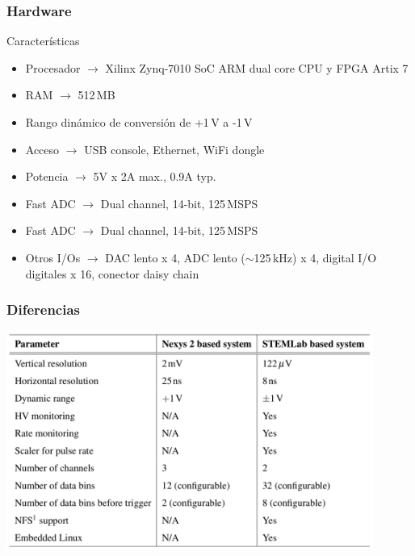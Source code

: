 \documentclass{beamer}
\begin{document}

\begin{frame}
	\frametitle{Hardware}
		\begin{exampleblock}{Características}
			\begin{itemize}
							\item Procesador $\to$ \alert{Xilinx Zynq-7010 SoC ARM dual core
											CPU y FPGA Artix 7}
				\item RAM $\to$ 512\,MB
				\item Rango dinámico de conversión de +1\,V a -1\,V
				\item Acceso $\to$ USB console, Ethernet, WiFi dongle
				\item Potencia $\to$ 5V x 2A max., 0.9A typ.
				\item Fast ADC $\to$ \alert{Dual channel, 14-bit, 125\,MSPS}
				\item Fast ADC $\to$ \alert{Dual channel, 14-bit, 125\,MSPS}
				\item Otros I/Os $\to$ DAC lento x 4, ADC lento ($\sim$125\,kHz) x 4,
								digital I/O digitales x 16, conector daisy chain 
			\end{itemize}
		\end{exampleblock}
\end{frame}

\begin{frame}
				\frametitle{Diferencias}
  \begin{block}{}
    \centering
    \includegraphics[width=0.9\textwidth]{diferencias_nexys_rp}
  \end{block}
\end{frame}
\end{document}
